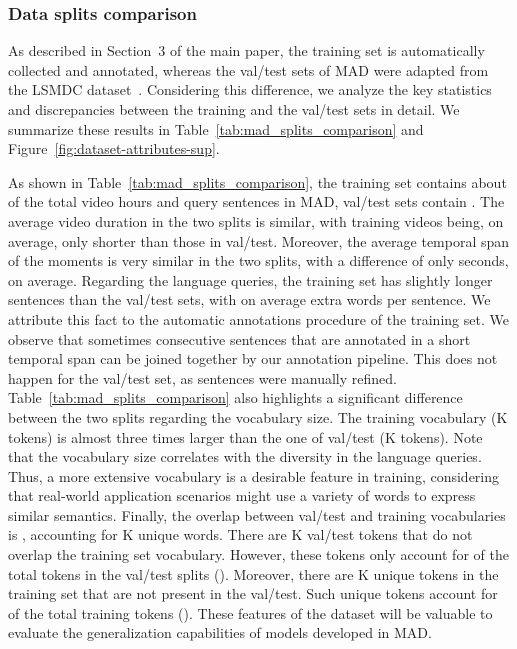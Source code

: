 \documentclass[10pt,twocolumn,letterpaper]{article}
\begin{document}
\subsubsection{Data splits comparison}
As described in Section~3 of the main paper, the training set is automatically collected and annotated, whereas the val/test sets of MAD were adapted from the LSMDC dataset~\cite{rohrbach2017movie}. Considering this difference, we analyze the key statistics and discrepancies between the training and the val/test sets in detail. We summarize these results in Table~\ref{tab:mad_splits_comparison} and Figure~\ref{fig:dataset-attributes-sup}.

As shown in Table~\ref{tab:mad_splits_comparison}, the training set contains about  of the total video hours and query sentences in MAD, val/test sets contain . The average video duration in the two splits is similar, with training videos being, on average, only  shorter than those in val/test.
Moreover, the average temporal span of the moments is very similar in the two splits, with a difference of only  seconds, on average. Regarding the language queries, the training set has slightly longer sentences than the val/test sets, with on average  extra words per sentence. We attribute this fact to the automatic annotations procedure of the training set. We observe that sometimes consecutive sentences that are annotated in a short temporal span can be joined together by our annotation pipeline. This does not happen for the val/test set, as sentences were manually refined. \\

Table~\ref{tab:mad_splits_comparison} also highlights a significant difference between the two splits regarding the vocabulary size. The training vocabulary (K tokens) is almost three times larger than the one of val/test (K tokens). Note that the vocabulary size correlates with the diversity in the language queries. Thus, a more extensive vocabulary is a desirable feature in training, considering that real-world application scenarios might use a variety of words to express similar semantics. 
Finally, the overlap between val/test and training vocabularies is , accounting for K unique words. 
There are K val/test tokens that do not overlap the training set vocabulary. However, these tokens only account for  of the total tokens in the val/test splits (). 
Moreover, there are K unique tokens in the training set that are not present in the val/test. Such unique tokens account for  of the total training tokens ().  
These features of the dataset will be valuable to evaluate the generalization capabilities of models developed in MAD.
\end{document}
